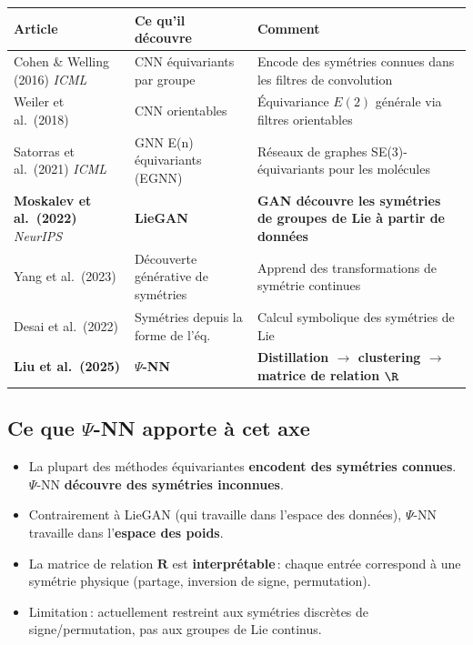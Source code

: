 \documentclass[11pt,a4paper]{article}
\begin{document}
\begin{center}
\renewcommand{\arraystretch}{1.3}
\begin{tabular}{@{}p{3.8cm} p{3.5cm} p{5.2cm}@{}}
\toprule
\textbf{Article} & \textbf{Ce qu'il découvre} & \textbf{Comment} \\
\midrule
Cohen \& Welling (2016) \textit{ICML} & CNN équivariants par groupe & Encode des symétries connues dans les filtres de convolution \\
\addlinespace
Weiler et al.\ (2018) & CNN orientables & Équivariance $E(2)$ générale via filtres orientables \\
\addlinespace
Satorras et al.\ (2021) \textit{ICML} & GNN E(n) équivariants (EGNN) & Réseaux de graphes SE(3)-équivariants pour les molécules \\
\addlinespace
\textbf{Moskalev et al.\ (2022)} \textit{NeurIPS} & \textbf{LieGAN} & \textbf{GAN découvre les symétries de groupes de Lie à partir de données} \\
\addlinespace
Yang et al.\ (2023) & Découverte générative de symétries & Apprend des transformations de symétrie continues \\
\addlinespace
Desai et al.\ (2022) & Symétries depuis la forme de l'éq. & Calcul symbolique des symétries de Lie \\
\addlinespace
\textbf{Liu et al.\ (2025)} & \textbf{$\Psi$-NN} & \textbf{Distillation $\to$ clustering $\to$ matrice de relation $\R$} \\
\bottomrule
\end{tabular}
\end{center}

\subsection{Ce que $\Psi$-NN apporte à cet axe}

\begin{tcolorbox}[colback=structure!5,colframe=structure!70!black,title={\small Contribution unique de $\Psi$-NN}]
\small
\begin{itemize}[leftmargin=1.2em,itemsep=1pt]
\item La plupart des méthodes équivariantes \textbf{encodent des symétries connues}. $\Psi$-NN \textbf{découvre des symétries inconnues}.
\item Contrairement à LieGAN (qui travaille dans l'espace des données), $\Psi$-NN travaille dans l'\textbf{espace des poids}.
\item La matrice de relation $\mathbf{R}$ est \textbf{interprétable}\,: chaque entrée correspond à une symétrie physique (partage, inversion de signe, permutation).
\item Limitation\,: actuellement restreint aux symétries discrètes de signe/permutation, pas aux groupes de Lie continus.
\end{itemize}
\end{tcolorbox}
\end{document}
